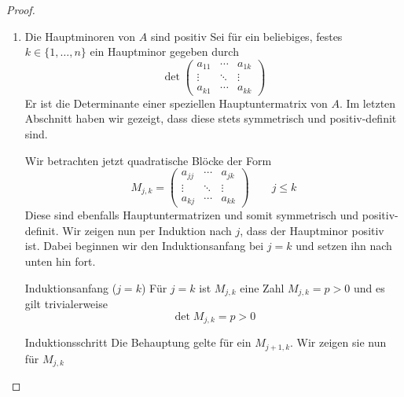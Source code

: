 \documentclass[a4paper]{scrartcl}
\numberwithin{equation}{section}
\begin{document}
\begin{st}
\begin{proof}
\begin{enumerate}
\begin{seg}{Jede Hauptuntermatrix $\tilde A$ von $A$ ist symmetrisch und positiv definit}
				Die Symmetrie ($a_{i_l,i_j} = a_{i_j,i_l}$) folgt aus der Symmetrie von $A$
				
				Jeder Vektor $\tilde x\in \R^k \neq 0$ kann folgendermaßen zu einem Vektor
				$x \in \R^n \neq 0$ erweitert werden:
				\[
					x_\my = \begin{cases} \tilde x_j & \text{falls $\my = i_j$}\\
				0 & \text{sonst}\end{cases}
				\]
				Dann ist
				\[
					\tilde x^T \tilde A \tilde x = x^T Ax > 0
				\]
				Also ist $\tilde A$ positiv-definit.
				\end{seg}
			\item \begin{seg}{Die Hauptminoren von $A$ sind positiv}
					Sei für ein beliebiges, festes $k\in \{1,\dotsc,n\}$ ein Hauptminor gegeben durch
				\[
					\det \begin{pmatrix}a_{11} & \cdots & a_{1k} \\ \vdots & \ddots & \vdots \\ a_{k1} & \cdots & a_{kk}\end{pmatrix}
				\]
				Er ist die Determinante einer speziellen Hauptuntermatrix von $A$.
				Im letzten Abschnitt haben wir gezeigt, dass diese stets symmetrisch und positiv-definit sind.

				Wir betrachten jetzt quadratische Blöcke der Form
				\[
					M_{j,k} = \begin{pmatrix}
						a_{jj} & \cdots & a_{jk}\\
						\vdots & \ddots & \vdots\\
						a_{kj} & \cdots & a_{kk}
					\end{pmatrix} \qquad j \le k
				\]
				Diese sind ebenfalls Hauptuntermatrizen und somit symmetrisch und positiv-definit.
				Wir zeigen nun per Induktion nach $j$, dass der Hauptminor positiv ist.
				Dabei beginnen wir den Induktionsanfang bei $j=k$ und setzen ihn nach unten hin fort.

				\begin{seg}{Induktionsanfang ($j=k$)}
					Für $j=k$ ist $M_{j,k}$ eine Zahl $M_{j,k} = p>0$ und es gilt trivialerweise
					\[
						\det M_{j,k} = p > 0
					\]
				\end{seg}
				\begin{seg}{Induktionsschritt}
					Die Behauptung gelte für ein $M_{j+1,k}$.
					Wir zeigen sie nun für $M_{j,k}$					
					

\end{seg}
\end{seg}
\end{enumerate}
\end{proof}
\end{st}
\end{document}

